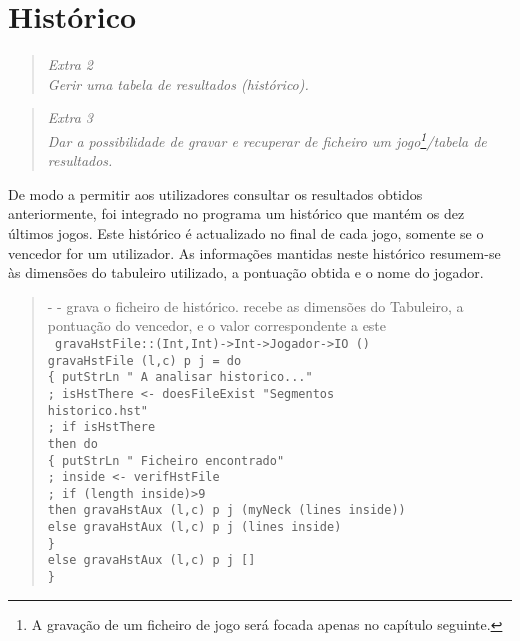 \documentclass[a4paper,titlepage]{scrreprt}
\begin{document}
\chapter{Histórico}
	\begin{quote}
		\begin{center}
			{\it
			Extra 2\\
			Gerir uma tabela de resultados (histórico).
			}
		\end{center}
	\end{quote}
	\begin{quote}
		\begin{center}
			{\it
			Extra 3\\
			Dar a possibilidade de gravar e recuperar de ficheiro um jogo\footnote{A gravação de um ficheiro de jogo será focada
			apenas no capítulo seguinte.}/tabela de resultados.
			}
		\end{center}
	\end{quote}
De modo a permitir aos utilizadores consultar os resultados obtidos anteriormente, foi integrado no programa um histórico que mantém
os dez últimos jogos. Este histórico é actualizado no final de cada jogo, somente se o vencedor for um utilizador. As informações mantidas
neste histórico resumem-se às dimensões do tabuleiro utilizado, a pontuação obtida e o nome do jogador.
	\begin{quote}
		{\small - - grava o ficheiro de histórico. recebe as dimensões do Tabuleiro, a pontuação do vencedor, e o valor correspondente a este\\}
		{\tt
		gravaHstFile::(Int,Int)->Int->Jogador->IO ()\\
		gravaHstFile (l,c) p j = do\\
		\{ putStrLn " A analisar historico..."\\
		; isHstThere <- doesFileExist "Segmentos\\historico.hst"\\
		; if isHstThere\\
		then do\\
		\{ putStrLn " Ficheiro encontrado"\\
		; inside <- verifHstFile\\
		; if (length inside)>9\\
		then gravaHstAux (l,c) p j (myNeck (lines inside))\\
		else gravaHstAux (l,c) p j (lines inside)\\
		\}\\									
		else gravaHstAux (l,c) p j []\\
		\}
		}
	\end{quote}
\end{document}
